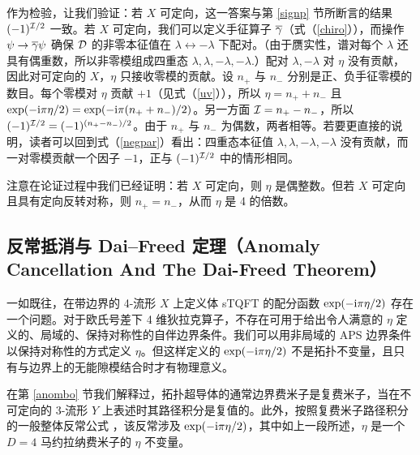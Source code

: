 
作为检验，让我们验证：若 $X$ 可定向，这一答案与第 \ref{signp} 节所断言的结果 $(-1)^{{\mathcal I}/2}$ 一致。若 $X$ 可定向，我们可以定义手征算子 $\overline{{\gamma}}$（式（\ref{chiro}）），而操作 $\psi\to{\overline\gamma}\psi$ 确保 ${\mathcal D}$ 的非零本征值在 $\lambda\leftrightarrow-\lambda$ 下配对。（由于赝实性，谱对每个 $\lambda$ 还具有偶重数，所以非零模组成四重态 $\lambda,\lambda,-\lambda,-\lambda.$）配对 $\lambda,-\lambda$ 对 $\eta$ 没有贡献，因此对可定向的 $X$，$\eta$ 只接收零模的贡献。设 $n_+$ 与 $n_-$ 分别是正、负手征零模的数目。每个零模对 $\eta$ 贡献 $+1$（见式（\ref{uv}）），所以 $\eta=n_++n_-$ 且 $\exp(-{\mathrm i}\pi\eta/2)=\exp(-{\mathrm i}\pi (n_++n_-)/2)$。另一方面 ${\mathcal I}=n_+-n_-$，所以 $(-1)^{{\mathcal I}/2}=(-1)^{(n_+-n_-)/2}$。由于 $n_+$ 与 $n_-$ 为偶数，两者相等。若要更直接的说明，读者可以回到式（\ref{negpar}）看出：四重态本征值 $\lambda,\lambda,-\lambda,-\lambda$ 没有贡献，而一对零模贡献一个因子 $-1$，正与 $(-1)^{{\mathcal I}/2}$ 中的情形相同。


注意在论证过程中我们已经证明：若 $X$ 可定向，则 $\eta$ 是偶整数。但若 $X$ 可定向且具有定向反转对称，则 $n_+=n_-$，从而 $\eta$ 是 4 的倍数。

\subsection{反常抵消与 Dai--Freed 定理（Anomaly Cancellation And The Dai-Freed Theorem）}\label{comb}

一如既往，在带边界的 4-流形 $X$ 上定义体 sTQFT 的配分函数 $\exp(-{\mathrm i}\pi\eta/2)$ 存在一个问题。对于欧氏号差下 4 维狄拉克算子，不存在可用于给出令人满意的 $\eta$ 定义的、局域的、保持对称性的自伴边界条件。我们可以用非局域的 APS 边界条件以保持对称性的方式定义 $\eta$。但这样定义的 $\exp(-{\mathrm i}\pi\eta/2)$ 不是拓扑不变量，且只有与边界上的无能隙模结合时才有物理意义。

在第 \ref{anombo} 节我们解释过，拓扑超导体的通常边界费米子是复费米子，当在不可定向的 3-流形 $Y$ 上表述时其路径积分是复值的。此外，按照复费米子路径积分的一般整体反常公式 \cite{Global}，该反常涉及 $\exp(-{\mathrm i}\pi\eta/2)$，其中如上一段所述，$\eta$ 是一个 $D=4$ 马约拉纳费米子的 $\eta$ 不变量。

